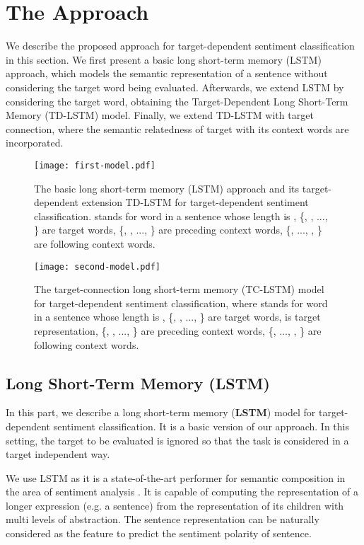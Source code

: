 \documentclass[11pt]{article}
\begin{document}
\section{The Approach}
We describe the proposed approach for target-dependent sentiment classification in this section. 
We first present a basic long short-term memory (LSTM) approach, which models the semantic representation of a sentence without considering the target word being evaluated.
Afterwards, we extend LSTM by considering the target word, obtaining the Target-Dependent Long Short-Term Memory (TD-LSTM) model.
Finally, we extend TD-LSTM with target connection, where the semantic relatedness of target with its context words are incorporated.

\begin{figure*}[t]
	\centering
	\texttt{[image: first-model.pdf]}
	\caption{The basic long short-term memory (LSTM) approach and its target-dependent extension TD-LSTM for target-dependent sentiment classification.  stands for word in a sentence whose length is , \{, , ..., \} are target words, \{, , ..., \} are preceding context words, \{, ..., , \} are following context words.}
	\label{fig:lstm-bilstm}
\end{figure*}

\begin{figure*}[t]
	\centering
	\texttt{[image: second-model.pdf]}
	\caption{The target-connection long short-term memory (TC-LSTM) model for target-dependent sentiment classification, where  stands for word in a sentence whose length is , \{, , ..., \} are target words,  is target representation, \{, , ..., \} are preceding context words, \{, ..., , \} are following context words.}
	\label{fig:framework}
\end{figure*}

\subsection{Long Short-Term Memory (LSTM)}
In this part, we describe a long short-term memory (\textbf{LSTM}) model for target-dependent sentiment classification.
It is a basic version of our approach.
In this setting, the target to be evaluated is ignored so that the task is considered in a target independent way. 

We use LSTM as it is a state-of-the-art performer for semantic composition in the area of sentiment analysis \cite{Li2015a,Tang2015}. 
It is capable of computing the representation of a longer expression (e.g. a sentence) from the representation of its children with multi levels of abstraction.
The sentence representation can be naturally considered as the feature to predict the sentiment polarity of sentence. 
\end{document}
